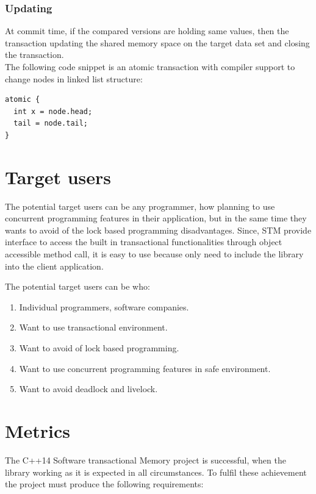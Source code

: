 \documentclass[12pt]{article}
\begin{document}
\subsubsection{Updating}
At commit time, if the compared versions are holding same values, then the transaction updating the shared memory space on the target data set and closing the transaction. \\

The following code snippet is an atomic transaction with compiler support to change nodes in linked list structure:
\begin{lstlisting}
atomic {
  int x = node.head;
  tail = node.tail;
}
\end{lstlisting}

\section{Target users}
The potential target users can be any programmer, how planning to use concurrent programming features in their application, but in the same time they wants to avoid of the lock based programming disadvantages. Since, STM provide interface to access the built in transactional functionalities through object accessible method call, it is easy to use because only need to include the library into the client application.\\

{\setlength{\parindent}{0cm}
The potential target users can be who:
\begin{enumerate}
\item Individual programmers, software companies. 
\item Want to use transactional environment.
\item Want to avoid of lock based programming.
\item Want to use concurrent programming features in safe environment.
\item Want to avoid deadlock and livelock.
\end{enumerate}
}

\clearpage
\section{Metrics}
The C++14 Software transactional Memory project is successful, when the library working as it is expected in all circumstances. To fulfil these achievement the project must produce the following requirements:\\
\end{document}
